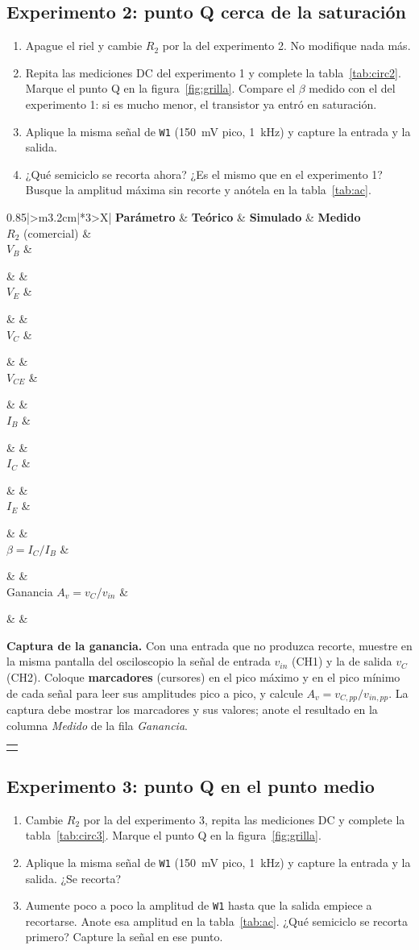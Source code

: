 \documentclass[11pt,a4paper]{article}
\newcommand{\cuadrorespuesta}{%
  \par\vspace{6pt}\noindent
  \begin{tabularx}{\linewidth}{|>{\centering\arraybackslash}X|}
    \hline
    \rule{0pt}{4.4cm}\raisebox{2.1cm}{\textcolor{black!45}{Figura}}\\
    \hline
    \rule{0pt}{2.0cm}\raisebox{0.9cm}{\textcolor{black!45}{Comentario}}\\
    \hline
  \end{tabularx}\par\vspace{8pt}%
}
\newcommand{\capturaganancia}{%
  \par\needspace{8.2cm}\vspace{4pt}\noindent
  \textbf{Captura de la ganancia.} Con una entrada que no produzca recorte, muestre en la
  misma pantalla del osciloscopio la señal de entrada $v_{in}$ (CH1) y la de salida $v_C$
  (CH2). Coloque \textbf{marcadores} (cursores) en el pico máximo y en el pico mínimo de
  cada señal para leer sus amplitudes pico a pico, y calcule
  $A_v = v_{C,pp}/v_{in,pp}$. La captura debe mostrar los marcadores y sus valores; anote el
  resultado en la columna \emph{Medido} de la fila \emph{Ganancia}.%
  \cuadrorespuesta
}
\newcommand{\hueco}{\rule{0pt}{0.5cm}}
\newcommand{\tablamedicion}[2]{%
  \begin{table}[H]
    \centering
    \renewcommand{\arraystretch}{1.15}
    \begin{tabularx}{0.85\linewidth}{|>{\centering\arraybackslash}m{3.2cm}|*{3}{>{\centering\arraybackslash}X|}}
      \hline
      \textbf{Parámetro} & \textbf{Teórico} & \textbf{Simulado} & \textbf{Medido}\\
      \hline
      $R_2$ (comercial) & \multicolumn{3}{c|}{\hueco} \\ \hline
      $V_B$      & \hueco & & \\ \hline
      $V_E$      & \hueco & & \\ \hline
      $V_C$      & \hueco & & \\ \hline
      $V_{CE}$   & \hueco & & \\ \hline
      $I_B$      & \hueco & & \\ \hline
      $I_C$      & \hueco & & \\ \hline
      $I_E$      & \hueco & & \\ \hline
      $\beta = I_C/I_B$ & \hueco & & \\ \hline
      Ganancia $A_v = v_C/v_{in}$ & \hueco & & \\ \hline
    \end{tabularx}
    \caption{#1}
    \label{#2}
  \end{table}%
}
\begin{document}
\subsection{Experimento 2: punto Q cerca de la saturación}
\begin{enumerate}[label=\roman*., leftmargin=*, labelsep=0.6em]
  \item Apague el riel y cambie $R_2$ por la del experimento 2. No modifique nada más.
  \item Repita las mediciones DC del experimento 1 y complete la tabla~\ref{tab:circ2}. Marque
        el punto Q en la figura~\ref{fig:grilla}. Compare el $\beta$ medido con el del
        experimento 1: si es mucho menor, el transistor ya entró en saturación.
  \item Aplique la misma señal de \texttt{W1} (\qty{150}{\milli\volt} pico,
        \qty{1}{\kilo\hertz}) y capture la entrada y la salida.
  \item ¿Qué semiciclo se recorta ahora? ¿Es el mismo que en el experimento 1? Busque la
        amplitud máxima sin recorte y anótela en la tabla~\ref{tab:ac}.
\end{enumerate}

\tablamedicion{Experimento 2: punto Q cerca de la saturación.}{tab:circ2}

\capturaganancia

\clearpage
\subsection{Experimento 3: punto Q en el punto medio}
\begin{enumerate}[label=\roman*., leftmargin=*, labelsep=0.6em]
  \item Cambie $R_2$ por la del experimento 3, repita las mediciones DC y complete la
        tabla~\ref{tab:circ3}. Marque el punto Q en la figura~\ref{fig:grilla}.
  \item Aplique la misma señal de \texttt{W1} (\qty{150}{\milli\volt} pico,
        \qty{1}{\kilo\hertz}) y capture la entrada y la salida. ¿Se recorta?
  \item Aumente poco a poco la amplitud de \texttt{W1} hasta que la salida empiece a
        recortarse. Anote esa amplitud en la tabla~\ref{tab:ac}. ¿Qué semiciclo se recorta
        primero? Capture la señal en ese punto.
\end{enumerate}
\end{document}
